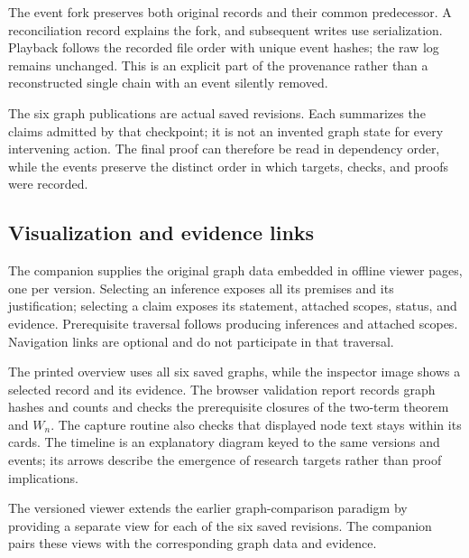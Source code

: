 The event fork preserves both original records and their common predecessor. A reconciliation record explains the fork, and subsequent writes use serialization. Playback follows the recorded file order with unique event hashes; the raw log remains unchanged. This is an explicit part of the provenance rather than a reconstructed single chain with an event silently removed.

The six graph publications are actual saved revisions. Each summarizes the claims admitted by that checkpoint; it is not an invented graph state for every intervening action. The final proof can therefore be read in dependency order, while the events preserve the distinct order in which targets, checks, and proofs were recorded.

\subsection{Visualization and evidence links}

The companion supplies the original graph data embedded in offline viewer pages, one per version. Selecting an inference exposes all its premises and its justification; selecting a claim exposes its statement, attached scopes, status, and evidence. Prerequisite traversal follows producing inferences and attached scopes. Navigation links are optional and do not participate in that traversal.

The printed overview uses all six saved graphs, while the inspector image shows a selected record and its evidence. The browser validation report records graph hashes and counts and checks the prerequisite closures of the two-term theorem and $W_n$. The capture routine also checks that displayed node text stays within its cards. The timeline is an explanatory diagram keyed to the same versions and events; its arrows describe the emergence of research targets rather than proof implications.

The versioned viewer extends the earlier graph-comparison paradigm by providing a separate view for each of the six saved revisions. The companion pairs these views with the corresponding graph data and evidence.
